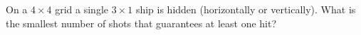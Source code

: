 On a $4\times4$ grid a single $3\times1$ ship is hidden (horizontally or vertically). What is the smallest number of shots that guarantees at least one hit?
